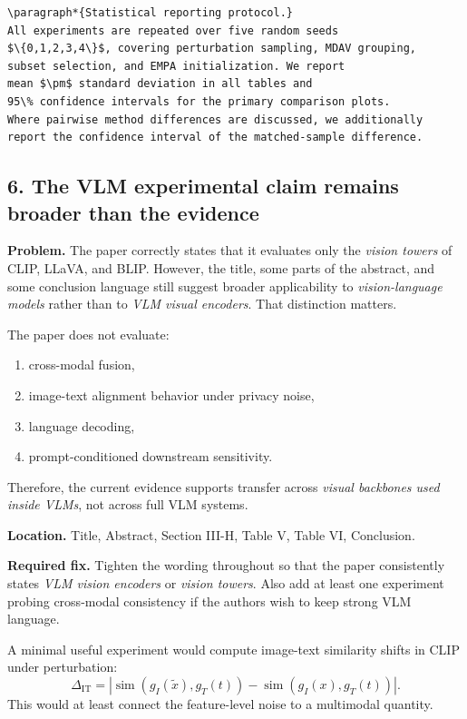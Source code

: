 \begin{verbatim}
\paragraph*{Statistical reporting protocol.}
All experiments are repeated over five random seeds
$\{0,1,2,3,4\}$, covering perturbation sampling, MDAV grouping,
subset selection, and EMPA initialization. We report
mean $\pm$ standard deviation in all tables and
95\% confidence intervals for the primary comparison plots.
Where pairwise method differences are discussed, we additionally
report the confidence interval of the matched-sample difference.
\end{verbatim}

\subsection*{6. The VLM experimental claim remains broader than the evidence}

\textbf{Problem.}  
The paper correctly states that it evaluates only the \emph{vision towers} of CLIP, LLaVA, and BLIP. However, the title, some parts of the abstract, and some conclusion language still suggest broader applicability to \emph{vision-language models} rather than to \emph{VLM visual encoders}. That distinction matters.

The paper does not evaluate:
\begin{enumerate}
\item cross-modal fusion,
\item image-text alignment behavior under privacy noise,
\item language decoding,
\item prompt-conditioned downstream sensitivity.
\end{enumerate}

Therefore, the current evidence supports transfer across \emph{visual backbones used inside VLMs}, not across full VLM systems.

\textbf{Location.}  
Title, Abstract, Section III-H, Table V, Table VI, Conclusion.

\textbf{Required fix.}  
Tighten the wording throughout so that the paper consistently states \emph{VLM vision encoders} or \emph{vision towers}. Also add at least one experiment probing cross-modal consistency if the authors wish to keep strong VLM language.

A minimal useful experiment would compute image-text similarity shifts in CLIP under perturbation:
\[
\Delta_{\mathrm{IT}}
=
\left|
\operatorname{sim}(g_I(\tilde x), g_T(t))
-
\operatorname{sim}(g_I(x), g_T(t))
\right|.
\]
This would at least connect the feature-level noise to a multimodal quantity.

